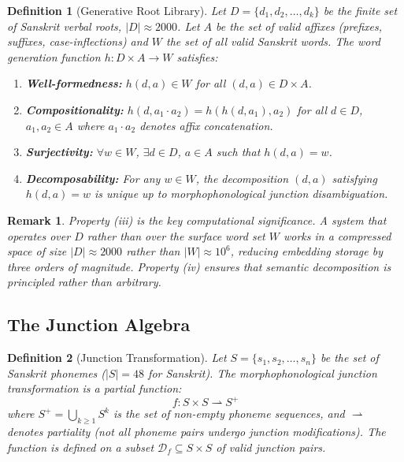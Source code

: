 \documentclass{article}
\newtheorem{definition}{Definition}
\newtheorem{remark}{Remark}
\begin{document}
\begin{definition}[Generative Root Library]
\label{def:dhatu}
Let $D = \{d_1, d_2, \ldots, d_k\}$ be the finite set of Sanskrit verbal roots, $|D| \approx 2000$. Let $A$ be the set of valid affixes (prefixes, suffixes, case-inflections) and $W$ the set of all valid Sanskrit words. The word generation function $h : D \times A \to W$ satisfies:
\begin{enumerate}[label=(\roman*)]
  \item \textbf{Well-formedness:} $h(d,a) \in W$ for all $(d,a) \in D \times A$.
  \item \textbf{Compositionality:} $h(d, a_1 \cdot a_2) = h(h(d,a_1), a_2)$ for all $d \in D$, $a_1, a_2 \in A$ where $a_1 \cdot a_2$ denotes affix concatenation.
  \item \textbf{Surjectivity:} $\forall w \in W$, $\exists d \in D$, $a \in A$ such that $h(d,a) = w$.
  \item \textbf{Decomposability:} For any $w \in W$, the decomposition $(d,a)$ satisfying $h(d,a) = w$ is unique up to morphophonological junction disambiguation.
\end{enumerate}
\end{definition}

\begin{remark}
Property (iii) is the key computational significance. A system that operates over $D$ rather than over the surface word set $W$ works in a compressed space of size $|D| \approx 2000$ rather than $|W| \approx 10^6$, reducing embedding storage by three orders of magnitude. Property (iv) ensures that semantic decomposition is principled rather than arbitrary.
\end{remark}

\subsection{The Junction Algebra}
\label{sec:sandhi}

\begin{definition}[Junction Transformation]
Let $S = \{s_1, s_2, \ldots, s_n\}$ be the set of Sanskrit phonemes ($|S| = 48$ for Sanskrit). The morphophonological junction transformation is a partial function:
\[
f : S \times S \rightharpoonup S^+
\]
where $S^+ = \bigcup_{k \geq 1} S^k$ is the set of non-empty phoneme sequences, and $\rightharpoonup$ denotes partiality (not all phoneme pairs undergo junction modifications). The function is defined on a subset $\mathcal{D}_f \subseteq S \times S$ of valid junction pairs.
\end{definition}
\end{document}
